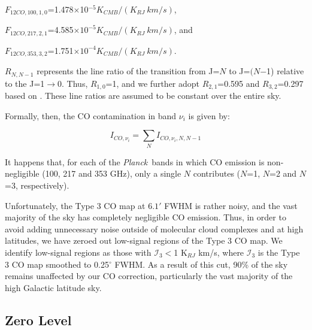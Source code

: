 \documentclass{emulateapj}
\newcommand{\PLANCK}{{\it Planck}}
\begin{document}
\noindent
$F_{12CO, 100, 1, 0}$=1.478$\times$10$^{-5}$$K_{CMB}/(K_{RJ} \ km/s)$,

\noindent
$F_{12CO, 217, 2, 1}$=4.585$\times$$10^{-5}$$K_{CMB}/(K_{RJ} \ km/s)$, and 

\noindent
$F_{12CO, 353, 3, 2}$=1.751$\times$$10^{-4}$$K_{CMB}/(K_{RJ} \ km/s)$.

\noindent
$R_{N, N-1}$ represents the line ratio of the transition from J=$N$ to 
J=$(N$$-$1) relative to the J=1$\rightarrow$0. Thus, $R_{1,0}$=1, and we 
further adopt $R_{2,1}$=0.595 and $R_{3,2}$=0.297 based on \cite{planckco}. 
These line ratios are assumed to be constant over the entire sky. 

Formally, then, the CO contamination in band $\nu_i$ is given by:


\begin{equation}
I_{CO, \nu_i} = \sum\limits_{N} I_{CO, \nu_i, N, N-1}
\end{equation}

It happens that, for each of the \PLANCK~bands in which CO emission is
non-negligible (100, 217 and 353 GHz), only a single $N$ contributes ($N$=1, 
$N$=2 and $N$=3, respectively). 

Unfortunately, the Type 3 CO map at $6.1'$ FWHM is rather noisy, and the vast
majority of the sky has completely negligible CO emission. Thus, in order to 
avoid adding unnecessary noise outside of molecular cloud complexes and at high
latitudes, we have zeroed out low-signal regions of the Type 3 CO map. We 
identify  low-signal regions as those with $\mathcal{I}_3$$<$1 K$_{RJ}$ km/s, 
where $\mathcal{I}_3$ is the Type 3 CO map smoothed to 0.25$^{\circ}$ FWHM. As 
a result of this cut, 90\% of the sky remains unaffected by our CO correction, 
particularly the vast majority of the high Galactic latitude sky.



\subsection{Zero Level}
\label{sec:zp}
\end{document}
